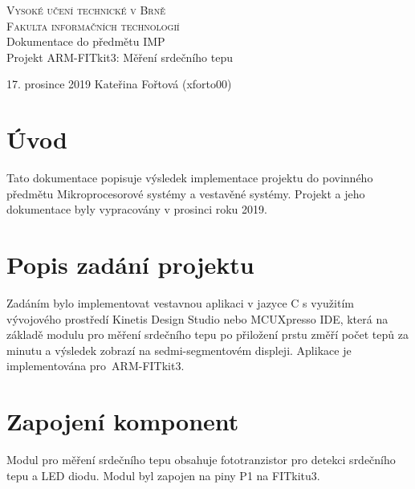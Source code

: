 \documentclass[a4paper, 11pt]{article}
\begin{document}
\begin{titlepage}
\begin{center}
\textsc{\Huge Vysoké učení technické v Brně\\ \medskip
\huge Fakulta informačních technologií}\\
\LARGE Dokumentace do předmětu IMP\\
\Huge  Projekt ARM-FITkit3: Měření srdečního tepu\\
\begin{Large}
17. prosince 2019\hfill
Kateřina Fořtová (xforto00)
\end{Large}
\end{center}



\end{titlepage}

\tableofcontents
\newpage
\section{Úvod}
Tato dokumentace popisuje výsledek implementace projektu do povinného předmětu Mikroprocesorové systémy a vestavěné systémy. Projekt a jeho dokumentace byly vypracovány v prosinci roku 2019.
\section{Popis zadání projektu}
Zadáním bylo implementovat vestavnou aplikaci v jazyce C s využitím vývojového prostředí Kinetis Design Studio nebo MCUXpresso IDE, která na základě modulu pro měření srdečního tepu po přiložení prstu změří počet tepů za minutu a výsledek zobrazí na sedmi-segmentovém displeji. Aplikace je implementována pro~ARM-FITkit3.
\section{Zapojení komponent}
Modul pro měření srdečního tepu obsahuje fototranzistor pro detekci srdečního tepu a LED diodu. Modul byl zapojen na piny P1 na FITkitu3.
\end{document}
